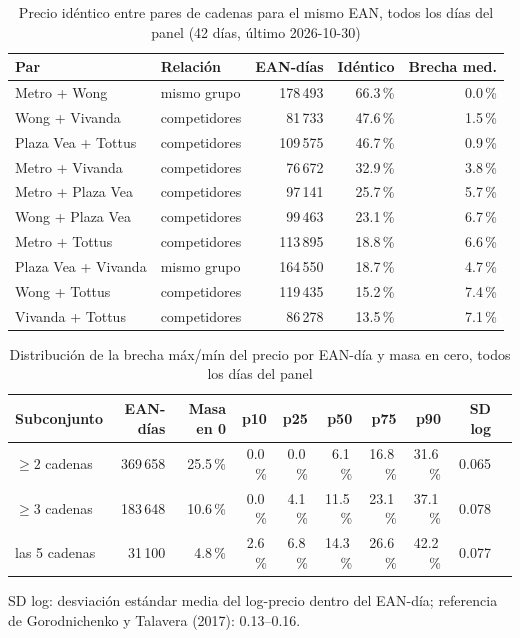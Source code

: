 
\begin{table}[htbp]
\caption{Precio id\'entico entre pares de cadenas para el mismo EAN, todos los d\'ias del panel (42 d\'ias, \'ultimo 2026-10-30)}
\label{tab:identidad}
\centering\scriptsize\setlength{\tabcolsep}{3pt}
\begin{tabular}{@{}llrrr@{}}
\toprule
Par & Relaci\'on & EAN-d\'ias & Id\'entico & Brecha med. \\
\midrule
Metro + Wong & mismo grupo & 178\,493 & 66.3\,\% & 0.0\,\% \\
Wong + Vivanda & competidores & 81\,733 & 47.6\,\% & 1.5\,\% \\
Plaza Vea + Tottus & competidores & 109\,575 & 46.7\,\% & 0.9\,\% \\
Metro + Vivanda & competidores & 76\,672 & 32.9\,\% & 3.8\,\% \\
Metro + Plaza Vea & competidores & 97\,141 & 25.7\,\% & 5.7\,\% \\
Wong + Plaza Vea & competidores & 99\,463 & 23.1\,\% & 6.7\,\% \\
Metro + Tottus & competidores & 113\,895 & 18.8\,\% & 6.6\,\% \\
Plaza Vea + Vivanda & mismo grupo & 164\,550 & 18.7\,\% & 4.7\,\% \\
Wong + Tottus & competidores & 119\,435 & 15.2\,\% & 7.4\,\% \\
Vivanda + Tottus & competidores & 86\,278 & 13.5\,\% & 7.1\,\% \\
\bottomrule\end{tabular}\end{table}

\begin{table}[t]
\caption{Distribuci\'on de la brecha m\'ax/m\'in del precio por EAN-d\'ia y masa en cero, todos los d\'ias del panel}
\label{tab:brecha}
\centering\scriptsize\setlength{\tabcolsep}{4pt}
\begin{tabular}{@{}lrrrrrrrrr@{}}
\toprule
Subconjunto & EAN-d\'ias & Masa en 0 & p10 & p25 & p50 & p75 & p90 & SD log \\
\midrule
$\geq 2$ cadenas & 369\,658 & 25.5\,\% & 0.0\,\% & 0.0\,\% & 6.1\,\% & 16.8\,\% & 31.6\,\% & 0.065 \\
$\geq 3$ cadenas & 183\,648 & 10.6\,\% & 0.0\,\% & 4.1\,\% & 11.5\,\% & 23.1\,\% & 37.1\,\% & 0.078 \\
las 5 cadenas & 31\,100 & 4.8\,\% & 2.6\,\% & 6.8\,\% & 14.3\,\% & 26.6\,\% & 42.2\,\% & 0.077 \\
\bottomrule\end{tabular}
\par\smallskip\raggedright\scriptsize SD log: desviaci\'on est\'andar media del log-precio dentro del EAN-d\'ia; referencia de Gorodnichenko y Talavera (2017): 0.13--0.16.
\end{table}

